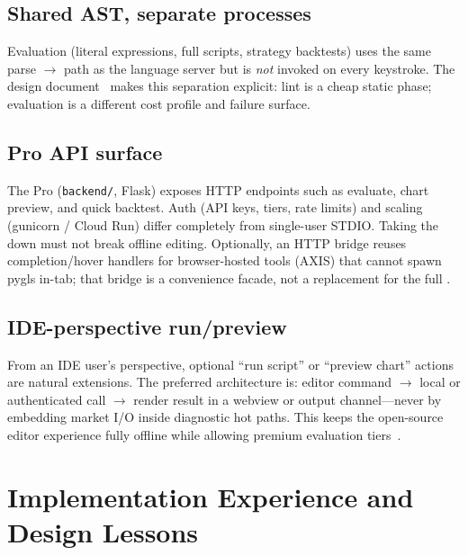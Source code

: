 \documentclass[11pt,a4paper]{article}
\begin{document}
\subsection{Shared AST, separate processes}
\label{sec:eval-boundary}

Evaluation (literal expressions, full scripts, strategy backtests) uses the same
parse \(\rightarrow\) \ast{} path as the language server but is \emph{not} invoked on
every keystroke. The design document~\citep{pynescript2026} makes this separation
explicit: lint is a cheap static phase; evaluation is a different cost profile and
failure surface.

\subsection{Pro API surface}
\label{sec:eval-pro}

The Pro \api{} (\texttt{backend/}, Flask) exposes HTTP endpoints such as evaluate, chart
preview, and quick backtest. Auth (API keys, tiers, rate limits) and scaling (gunicorn /
Cloud Run) differ completely from single-user STDIO. Taking the \api{} down must not
break offline editing. Optionally, an HTTP bridge reuses completion/hover handlers for
browser-hosted tools (AXIS) that cannot spawn pygls in-tab; that bridge is a convenience
facade, not a replacement for the full \lsp{}.

\subsection{IDE-perspective run/preview}
\label{sec:eval-ide}

From an IDE user's perspective, optional ``run script'' or ``preview chart'' actions
are natural extensions. The preferred architecture is: editor command \(\rightarrow\)
local \cli{} or authenticated \api{} call \(\rightarrow\) render result in a webview or
output channel---never by embedding market I/O inside diagnostic hot paths. This keeps
the open-source editor experience fully offline while allowing premium evaluation
tiers~\citep{hoox2026}.

\section{Implementation Experience and Design Lessons}
\label{sec:lessons}
\end{document}
